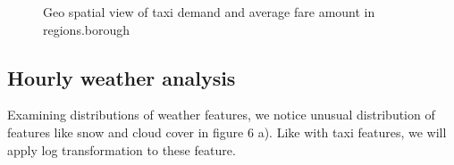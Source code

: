 \documentclass[11pt]{article}
\begin{document}
\begin{figure}[h]
    \hspace{-2cm} %
    \hfill
    \caption{Geo spatial view of taxi demand and average fare amount in regions.borough} %
\end{figure}


\subsection{Hourly weather analysis}
Examining distributions of weather features, we notice unusual distribution of features like snow and cloud cover in figure 6 a). Like with taxi features, we will apply log transformation to these feature.
\end{document}
